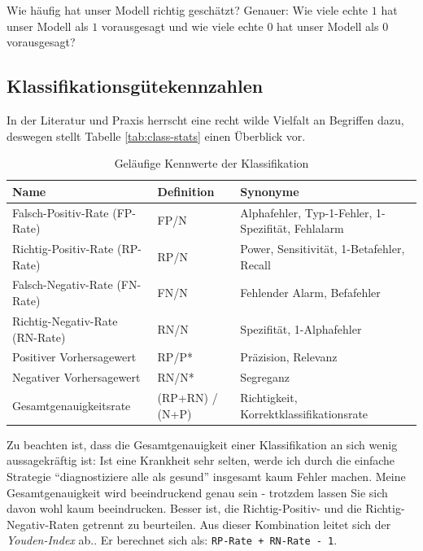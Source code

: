 \documentclass[12pt,ngerman,]{book}
\theoremstyle{definition}
\theoremstyle{definition}
\theoremstyle{remark}
\begin{document}
Wie häufig hat unser Modell richtig geschätzt? Genauer: Wie viele echte
\(1\) hat unser Modell als \(1\) vorausgesagt und wie viele echte \(0\)
hat unser Modell als \(0\) vorausgesagt?

\subsection{Klassifikationsgütekennzahlen}\label{klassifikationsgutekennzahlen}

In der Literatur und Praxis herrscht eine recht wilde Vielfalt an
Begriffen dazu, deswegen stellt Tabelle \ref{tab:class-stats} einen
Überblick vor.

\begin{table}

\caption{\label{tab:diag-stats}Geläufige Kennwerte der Klassifikation}
\centering
\begin{tabular}[t]{l|l|l}
\hline
Name & Definition & Synonyme\\
\hline
Falsch-Positiv-Rate (FP-Rate) & FP/N & Alphafehler, Typ-1-Fehler, 1-Spezifität, Fehlalarm\\
\hline
Richtig-Positiv-Rate (RP-Rate) & RP/N & Power, Sensitivität, 1-Betafehler, Recall\\
\hline
Falsch-Negativ-Rate (FN-Rate) & FN/N & Fehlender Alarm, Befafehler\\
\hline
Richtig-Negativ-Rate (RN-Rate) & RN/N & Spezifität, 1-Alphafehler\\
\hline
Positiver Vorhersagewert & RP/P* & Präzision, Relevanz\\
\hline
Negativer Vorhersagewert & RN/N* & Segreganz\\
\hline
Gesamtgenauigkeitsrate & (RP+RN) / (N+P) & Richtigkeit, Korrektklassifikationsrate\\
\hline
\end{tabular}
\end{table}

Zu beachten ist, dass die Gesamtgenauigkeit einer Klassifikation an sich
wenig aussagekräftig ist: Ist eine Krankheit sehr selten, werde ich
durch die einfache Strategie ``diagnostiziere alle als gesund''
insgesamt kaum Fehler machen. Meine Gesamtgenauigkeit wird beeindruckend
genau sein - trotzdem lassen Sie sich davon wohl kaum beeindrucken.
Besser ist, die Richtig-Positiv- und die Richtig-Negativ-Raten getrennt
zu beurteilen. Aus dieser Kombination leitet sich der
\emph{Youden-Index} ab.. Er berechnet sich als:
\texttt{RP-Rate\ +\ RN-Rate\ -\ 1}.
\end{document}
